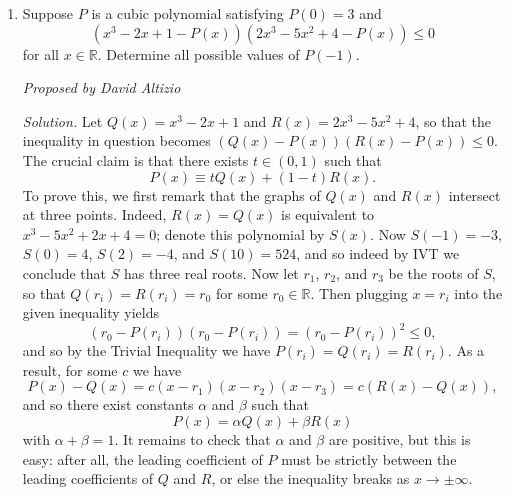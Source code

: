 \documentclass[10pt]{article}
\newcommand{\proposed}[1]
{
\vspace{5pt}
\noindent\textit{Proposed by #1}
}
\newcommand{\solution}
{
\vspace{5pt}
\noindent\textit{Solution.}\qquad
}
\begin{document}
\begin{enumerate}
\begin{center}OR\end{center}

\solution Let $P(x)=x^{2018}-1$, and let $z_k=e^{\frac{2i\pi k}{2018}}$ correspond to the roots of this polynomial. Then the sum is \begin{align*}\sum_{k=0}^{2017}\dfrac{5+\cos\left(\frac{\pi k}{1009}\right)}{26+10\cos\left(\frac{\pi k}{1009}\right)}&=\sum_{k=0}^{2017}\frac{5+\frac{z_k+\frac{1}{z_k}}{2}}{26+10\frac{z_k+\frac{1}{z_k}}{2}}=\sum_{k=0}^{2017}\frac{z_k^2+10z_k+1}{2(z_k+5)(5z_k+1)}\\&=\sum_{k=0}^{2017}\frac{1}{10}+\frac{1}{2}\sum_{k=0}^{2017}\frac{1}{z_k+5}-\frac{1}{50}\sum_{k=0}^{2017}\frac{1}{z_k+\frac{1}{5}}=\frac{2018}{10}-\frac{P'(-5)}{2P(-5)}+\frac{P'\left(-\frac{1}{5}\right)}{50P\left(-\frac{1}{5}\right)}\end{align*} which, with some computation, yields the desired answer of $\boxed{\tfrac{2018\cdot 5^{2017}}{5^{2018}-1}}$.

\item Suppose $P$ is a cubic polynomial satisfying $P(0) = 3$ and \[(x^3 - 2x + 1 - P(x))(2x^3 - 5x^2 + 4 - P(x))\leq 0\] for all $x\in\mathbb R$.  Determine all possible values of $P(-1)$.

\proposed{David Altizio}

\solution Let $Q(x) = x^3 - 2x + 1$ and $R(x) = 2x^3 - 5x^2 + 4$, so that the inequality in question becomes $(Q(x) - P(x))(R(x) - P(x))\leq 0$.  The crucial claim is that there exists $t\in(0,1)$ such that \[P(x) \equiv tQ(x) + (1-t)R(x).\] To prove this, we first remark that the graphs of $Q(x)$ and $R(x)$ intersect at three points.  Indeed, $R(x) = Q(x)$ is equivalent to $x^3 - 5x^2 + 2x + 4 = 0$; denote this polynomial by $S(x)$.  Now $S(-1) = -3$, $S(0) = 4$, $S(2) = -4$, and $S(10) = 524$, and so indeed by IVT we conclude that $S$ has three real roots. Now let $r_1$, $r_2$, and $r_3$ be the roots of $S$, so that $Q(r_i) = R(r_i) = r_0$ for some $r_0\in\mathbb R$.  Then plugging $x=r_i$ into the given inequality yields \[(r_0 - P(r_i))(r_0 - P(r_i)) = (r_0 - P(r_i))^2 \leq 0,\] and so by the Trivial Inequality we have $P(r_i) = Q(r_i) = R(r_i)$.  As a result, for some $c$ we have \[P(x) - Q(x) = c(x-r_1)(x-r_2)(x-r_3) = c(R(x) - Q(x)),\] and so there exist constants $\alpha$ and $\beta$ such that \[P(x) = \alpha Q(x) + \beta R(x)\] with $\alpha + \beta = 1$.  It remains to check that $\alpha$ and $\beta$ are positive, but this is easy: after all, the leading coefficient of $P$ must be strictly between the leading coefficients of $Q$ and $R$, or else the inequality breaks as $x\to\pm\infty$.


\end{enumerate}
\end{document}
